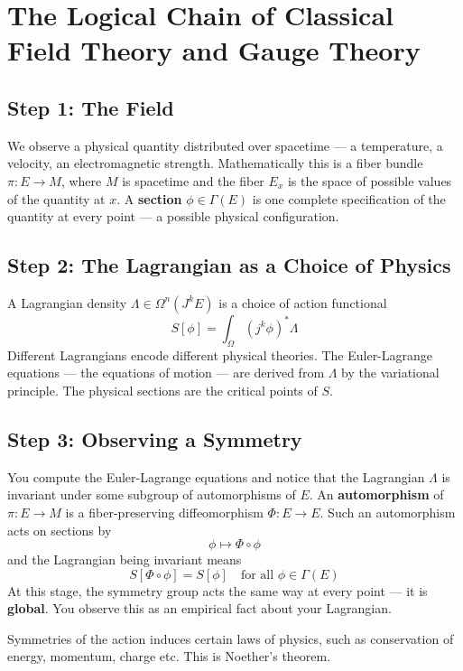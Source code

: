 \documentclass[a4paper]{article}
\begin{document}
\pagebreak
\section{The Logical Chain of Classical Field Theory and Gauge Theory}

\subsection*{Step 1: The Field}

We observe a physical quantity distributed over spacetime — a temperature, a velocity, an electromagnetic strength. Mathematically this is a fiber bundle $\pi: E \to M$, where $M$ is spacetime and the fiber $E_x$ is the space of possible values of the quantity at $x$. A \textbf{section} $\phi \in \Gamma(E)$ is one complete specification of the quantity at every point — a possible physical configuration.

\subsection*{Step 2: The Lagrangian as a Choice of Physics}

A Lagrangian density $\Lambda \in \Omega^n(J^kE)$ is a choice of action functional
\[
S[\phi] = \int_\Omega (j^k\phi)^*\Lambda
\]
Different Lagrangians encode different physical theories. The Euler-Lagrange equations — the equations of motion — are derived from $\Lambda$ by the variational principle. The physical sections are the critical points of $S$.

\subsection*{Step 3: Observing a Symmetry}

You compute the Euler-Lagrange equations and notice that the Lagrangian $\Lambda$ is invariant under some subgroup of automorphisms of $E$. An \textbf{automorphism} of $\pi: E \to M$ is a fiber-preserving diffeomorphism $\Phi: E \to E$. Such an automorphism acts on sections by
\[
\phi \mapsto \Phi \circ \phi
\]
and the Lagrangian being invariant means
\[
S[\Phi \circ \phi] = S[\phi] \quad \text{for all } \phi \in \Gamma(E)
\]
At this stage, the symmetry group acts the same way at every point — it is \textbf{global}. You observe this as an empirical fact about your Lagrangian. 

Symmetries of the action induces certain laws of physics, such as conservation of energy, momentum, charge etc. This is Noether's theorem. 
\end{document}

